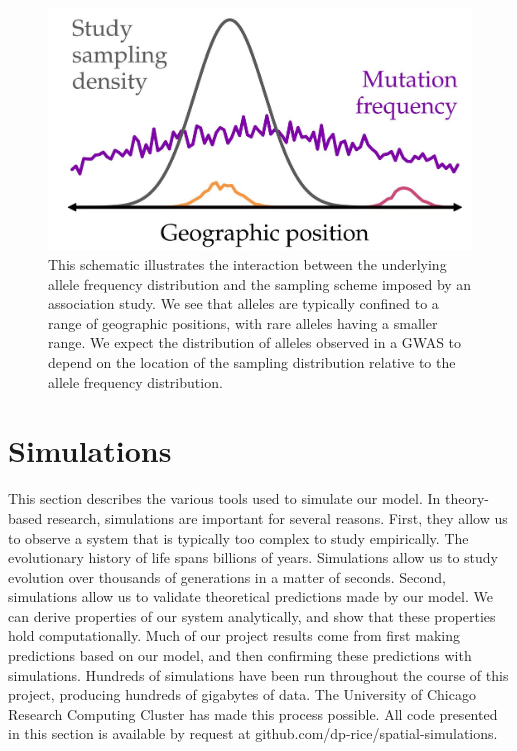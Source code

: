 \begin{figure}[h]
    \centering
    \includegraphics[scale=0.4]{img/smapling_schematic.JPG}
    \caption{This schematic illustrates the interaction between the underlying allele frequency distribution and the sampling scheme imposed by an association study. We see that alleles are typically confined to a range of geographic positions, with rare alleles having a smaller range. We expect the distribution of alleles observed in a GWAS to depend on the location of the sampling distribution relative to the allele frequency distribution.}
    \label{fig:sampling_schematic}
\end{figure}

\newpage
\section{Simulations}

This section describes the various tools used to simulate our model. In theory-based research, simulations are important for several reasons. First, they allow us to observe a system that is typically too complex to study empirically. The evolutionary history of life spans billions of years. Simulations allow us to study evolution over thousands of generations in a matter of seconds. Second, simulations allow us to validate theoretical predictions made by our model. We can derive properties of our system analytically, and show that these properties hold computationally. Much of our project results come from first making predictions based on our model, and then confirming these predictions with simulations. Hundreds of simulations have been run throughout the course of this project, producing hundreds of gigabytes of data. The University of Chicago Research Computing Cluster has made this process possible. All code presented in this section is available by request at github.com/dp-rice/spatial-simulations. 


